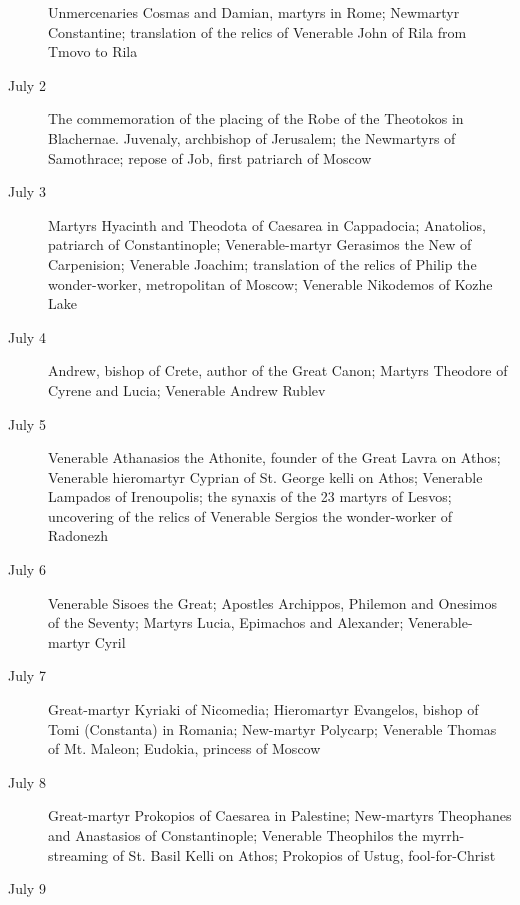 \begin{description}
Unmercenaries Cosmas and Damian, martyrs in Rome; Newmartyr Constantine; translation of the relics of Venerable John of Rila from Tmovo to Rila

\item[July 2]

The commemoration of the placing of the Robe of the Theotokos in Blachernae. Juvenaly, archbishop of Jerusalem; the Newmartyrs of Samothrace; repose of Job, first patriarch of Moscow

\item[July 3]

Martyrs Hyacinth and Theodota of Caesarea in Cappadocia; Anatolios, patriarch of Constantinople; Venerable-martyr Gerasimos the New of Carpenision; Venerable Joachim; translation of the relics of Philip the wonder-worker, metropolitan of Moscow; Venerable Nikodemos of Kozhe Lake

\item[July 4]

Andrew, bishop of Crete, author of the Great Canon; Martyrs Theodore of Cyrene and Lucia; Venerable Andrew Rublev

\item[July 5]

Venerable Athanasios the Athonite, founder of the Great Lavra on Athos; Venerable hieromartyr Cyprian of St. George kelli on Athos; Venerable Lampados of Irenoupolis; the synaxis of the 23 martyrs of Lesvos; uncovering of the relics of Venerable Sergios the wonder-worker of Radonezh

\item[July 6]

Venerable Sisoes the Great; Apostles Archippos, Philemon and Onesimos of the Seventy; Martyrs Lucia, Epimachos and Alexander; Venerable-martyr Cyril

\item[July 7]

Great-martyr Kyriaki of Nicomedia; Hieromartyr Evangelos, bishop of Tomi (Constanta) in Romania; New-martyr Polycarp; Venerable Thomas of Mt. Maleon; Eudokia, princess of Moscow

\item[July 8]

Great-martyr Prokopios of Caesarea in Palestine; New-martyrs Theophanes and Anastasios of Constantinople; Venerable Theophilos the myrrh-streaming of St. Basil Kelli on Athos; Prokopios of Ustug, fool-for-Christ

\item[July 9]


\end{description}
